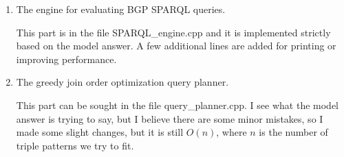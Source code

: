\documentclass{article}
\begin{document}
\begin{enumerate}
\begin{enumerate}
3) To match the patterns like $\langle X, Y, Z\rangle$, the paper suggests to iterate over the triple table; if we want $X = Y$,  we skip those $X\neq Y$. I modify this a little bit to improve the efficiency. Again, $\langle X, X, Z\rangle$, for example, we first iterate $I_s$, and for each $s$ in $I_s$, we find if $I_{sp}$ includes hash($s, s$), if yes, we traverse over the triple table. As shown in the pseudo-code in Algorithm \eqref{alg:evaluateXXP}\footnote{The actual implementation is slightly different. I put the check of if $i$ in $I_{sp}$ at the beginning of the Evaluate\_SPZ to reduce some code redundancy, but they are equivalent.}.

\begin{algorithm}[H]
\caption{Evaluate $\langle X, X, Z\rangle$}\label{alg:evaluateXXP}
\begin{algorithmic}
\State $i = $ hash($s, s$)
\State Evaluate\_SPZ($s, s$)
\EndIf
\EndFor
\end{algorithmic}
\end{algorithm}

$\langle X, Y, Y\rangle$ and $\langle X, Y, X\rangle$ are similar. For $\langle X, X, X\rangle$, we only need to traverse  $s$ in $I_s$ and find if $\langle s, s, s\rangle$ is in $I_{spo}$ as shown in  Algorithm \eqref{alg:evaluateXXX}.

\begin{algorithm}[H]
\caption{Evaluate $\langle X, X, X\rangle$}\label{alg:evaluateXXX}
\begin{algorithmic}
\State Evaluate\_SPO($s, s, s$) 
\EndFor
\end{algorithmic}
\end{algorithm}

\item The engine for evaluating BGP SPARQL queries.

This part is in the file SPARQL\_engine.cpp and it is implemented strictly based on the model answer. A few additional lines are added for printing or improving performance.

\item The greedy join order optimization query planner.

This part can be sought in the file query\_planner.cpp. I see what the model answer is trying to say, but I believe there are some minor mistakes, so I made some slight changes, but it is still $O(n)$, where $n$ is the number of triple patterns we try to fit. 


\end{enumerate}
\end{enumerate}
\end{document}

